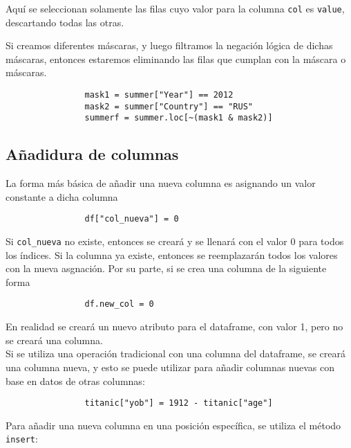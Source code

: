             Aquí se seleccionan solamente las filas cuyo valor para la columna \texttt{col} es \texttt{value}, descartando todas las otras.

            Si creamos diferentes máscaras, y luego filtramos la negación lógica de dichas máscaras, entonces estaremos eliminando las filas que cumplan con la máscara o máscaras.

            \begin{verbatim}
                mask1 = summer["Year"] == 2012
                mask2 = summer["Country"] == "RUS"
                summerf = summer.loc[~(mask1 & mask2)]
            \end{verbatim}


        \subsection{Añadidura de columnas}

            La forma más básica de añadir una nueva columna es asignando un valor constante a dicha columna

            \begin{verbatim}
                df["col_nueva"] = 0
            \end{verbatim}

            Si \texttt{col\_nueva} no existe, entonces se creará y se llenará con el valor 0 para todos los índices. Si la columna ya existe, entonces se reemplazarán todos los valores con la nueva asgnación. Por su parte, si se crea una columna de la siguiente forma

            \begin{verbatim}
                df.new_col = 0
            \end{verbatim}

            En realidad se creará un nuevo atributo para el dataframe, con valor 1, pero no se creará una columna.\\

            Si se utiliza una operación tradicional con una columna del dataframe, se creará una columna nueva, y esto se puede utilizar para añadir columnas nuevas con base en datos de otras columnas:

            \begin{verbatim}
                titanic["yob"] = 1912 - titanic["age"]
            \end{verbatim}

            Para añadir una nueva columna en una posición específica, se utiliza el método \texttt{insert}:

